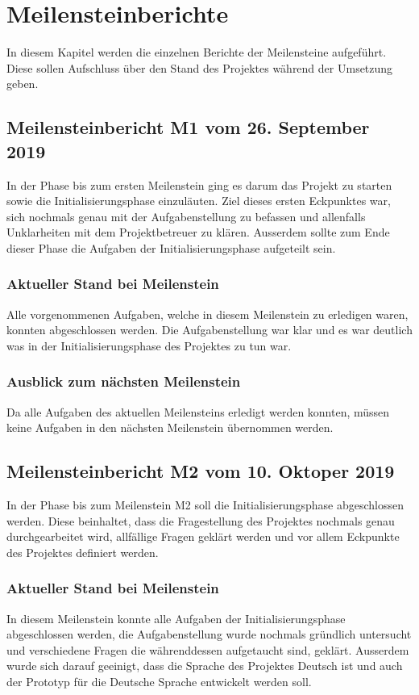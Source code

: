 \chapter{Meilensteinberichte}
\label{app:meilensteinberichte}
In diesem Kapitel werden die einzelnen Berichte der Meilensteine aufgeführt. Diese sollen Aufschluss über den Stand des
Projektes während der Umsetzung geben.

\section{Meilensteinbericht M1 vom 26. September 2019}
In der Phase bis zum ersten Meilenstein ging es darum das Projekt zu starten sowie die Initialisierungsphase
einzuläuten. Ziel dieses ersten Eckpunktes war, sich nochmals genau mit der Aufgabenstellung zu befassen und allenfalls
Unklarheiten mit dem Projektbetreuer zu klären. Ausserdem sollte zum Ende dieser Phase die Aufgaben der
Initialisierungsphase aufgeteilt sein.

\subsection{Aktueller Stand bei Meilenstein}
Alle vorgenommenen Aufgaben, welche in diesem Meilenstein zu erledigen waren, konnten abgeschlossen werden. Die
Aufgabenstellung war klar und es war deutlich was in der Initialisierungsphase des Projektes zu tun war.

\subsection{Ausblick zum nächsten Meilenstein}
Da alle Aufgaben des aktuellen Meilensteins erledigt werden konnten, müssen keine Aufgaben in den nächsten Meilenstein
übernommen werden.

\section{Meilensteinbericht M2 vom 10. Oktoper 2019}
In der Phase bis zum Meilenstein M2 soll die Initialisierungsphase abgeschlossen werden. Diese beinhaltet, dass die
Fragestellung des Projektes nochmals genau durchgearbeitet wird, allfällige Fragen geklärt werden und vor allem
Eckpunkte des Projektes definiert werden.

\subsection{Aktueller Stand bei Meilenstein}
In diesem Meilenstein konnte alle Aufgaben der Initialisierungsphase abgeschlossen werden, die Aufgabenstellung wurde
nochmals gründlich untersucht und verschiedene Fragen die währenddessen aufgetaucht sind, geklärt. Ausserdem wurde sich
darauf geeinigt, dass die Sprache des Projektes Deutsch ist und auch der Prototyp für die Deutsche Sprache entwickelt
werden soll.


